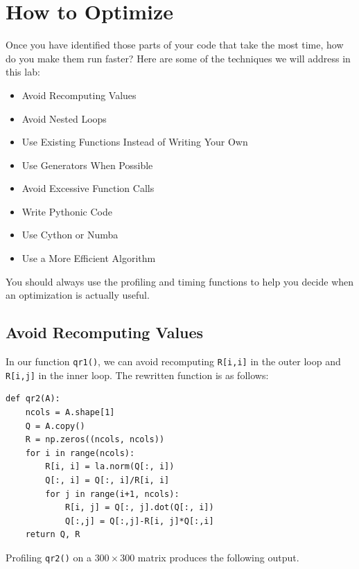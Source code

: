 \section*{How to Optimize}
Once you have identified those parts of your code that take the most time, how do you make them run faster?
Here are some of the techniques we will address in this lab:
\begin{itemize}
\item Avoid Recomputing Values
\item Avoid Nested Loops
\item Use Existing Functions Instead of Writing Your Own
\item Use Generators When Possible
\item Avoid Excessive Function Calls
\item Write Pythonic Code
\item Use Cython or Numba
\item Use a More Efficient Algorithm
\end{itemize}
You should always use the profiling and timing functions to help you decide when an optimization is actually useful.

\subsection*{Avoid Recomputing Values}
In our function \texttt{qr1()}, we can avoid recomputing \texttt{R[i,i]} in the outer loop and \texttt{R[i,j]} in the inner loop.
The rewritten function is as follows:
\begin{lstlisting}
def qr2(A):
    ncols = A.shape[1]
    Q = A.copy()
    R = np.zeros((ncols, ncols))
    for i in range(ncols):
        R[i, i] = la.norm(Q[:, i])
        Q[:, i] = Q[:, i]/R[i, i]
        for j in range(i+1, ncols):
            R[i, j] = Q[:, j].dot(Q[:, i])
            Q[:,j] = Q[:,j]-R[i, j]*Q[:,i]
    return Q, R
\end{lstlisting}

Profiling \texttt{qr2()} on a $300 \times 300$ matrix produces the following output.

